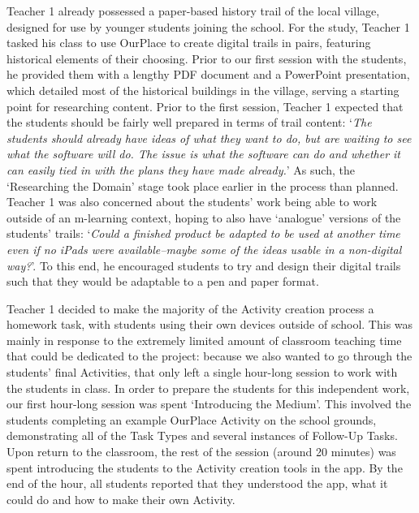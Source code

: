 \documentclass[,hyphens]{sigchi}
\begin{document}
Teacher 1 already possessed a paper-based history trail of the local village, designed for use by younger students joining the school. For the study, Teacher 1 tasked his class to use OurPlace to create digital trails in pairs, featuring historical elements of their choosing. Prior to our first session with the students, he provided them with a lengthy PDF document and a PowerPoint presentation, which detailed most of the historical buildings in the village, serving a starting point for researching content. Prior to the first session, Teacher 1 expected that the students should be fairly well prepared in terms of trail content: `\textit{The students should already have ideas of what they want to do, but are waiting to see what the software will do. The issue is what the software can do and whether it can easily tied in with the plans they have made already.}'  As such, the `Researching the Domain' stage took place earlier in the process than planned. Teacher 1 was also concerned about the students' work being able to work outside of an m-learning context, hoping to also have `analogue' versions of the students' trails: `\textit{Could a finished product be adapted to be used at another time even if no iPads were available--maybe some of the ideas usable in a non-digital way?}'. To this end, he encouraged students to try and design their digital trails such that they would be adaptable to a pen and paper format.

Teacher 1 decided to make the majority of the Activity creation process a homework task, with students using their own devices outside of school. This was mainly in response to the extremely limited amount of classroom teaching time that could be dedicated to the project: because we also wanted to go through the students' final Activities, that only left a single hour-long session to work with the students in class. In order to prepare the students for this independent work, our first hour-long session was spent `Introducing the Medium'. This involved the students completing an example OurPlace Activity on the school grounds, demonstrating all of the Task Types and several instances of Follow-Up Tasks. Upon return to the classroom, the rest of the session (around 20 minutes) was spent introducing the students to the Activity creation tools in the app. By the end of the hour, all students reported that they understood the app, what it could do and how to make their own Activity.
\end{document}
